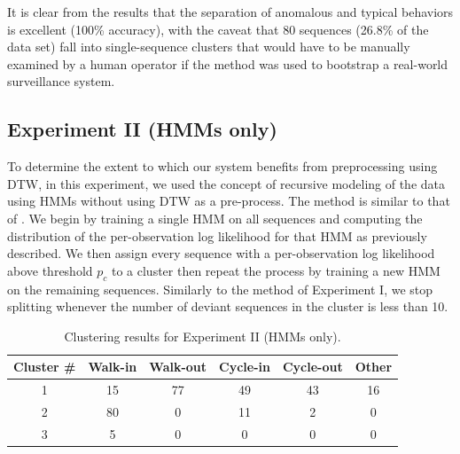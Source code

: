 It is clear from the results that the separation of anomalous and
typical behaviors is excellent (100\% accuracy), with the caveat that
80 sequences (26.8\% of the data set) fall into single-sequence
clusters that would have to be manually examined by a human operator
if the method was used to bootstrap a real-world surveillance system.

\DIFaddbegin {}

\DIFaddend \subsection{Experiment II (HMMs only)}

To determine the extent to which our system benefits from
preprocessing using DTW, in this experiment, we used the concept of
recursive modeling of the data using HMMs without using DTW as a
pre-process.  The method is similar to that
of .  We begin by training a single HMM
on all sequences and computing the distribution of the per-observation
log likelihood for that HMM as previously described.  We then assign
every sequence with a per-observation log likelihood above threshold
$p_c$ to a cluster then repeat the process by training a new HMM on
the remaining sequences.  Similarly to the method of Experiment I, we
stop splitting whenever the number of deviant sequences in the cluster
is less than 10.

\begin{table}[t]
  \caption[Clustering results for Experiment II (HMMs only).]{\small
    Clustering results for Experiment II (HMMs only).}
  \label{tab:hmm-assoc-matrix}
  \begin{center}
    \begin{tabular}{c|c|c|c|c|c}
      \hline
      Cluster \# & Walk-in & Walk-out & Cycle-in & Cycle-out & Other \\ 
      \hline \hline
      1 & 15 & 77 & 49 & 43 & 16 \\ \hline
      2 & 80 & 0 & 11 & 2 & 0 \\ \hline	
      3 & 5 & 0 & 0 & 0 & 0 \\ \hline	
    \end{tabular}
  \end{center}
\end{table}

